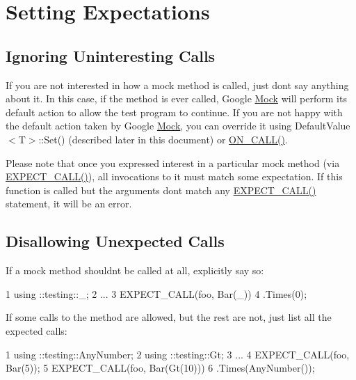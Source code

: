\section*{Setting Expectations}

\subsection*{Ignoring Uninteresting Calls}

If you are not interested in how a mock method is called, just don\textquotesingle{}t say anything about it. In this case, if the method is ever called, Google \hyperlink{class_mock}{Mock} will perform its default action to allow the test program to continue. If you are not happy with the default action taken by Google \hyperlink{class_mock}{Mock}, you can override it using {\ttfamily Default\+Value$<$T$>$\+::\+Set()} (described later in this document) or {\ttfamily \hyperlink{gmock-spec-builders_8h_a5b12ae6cf84f0a544ca811b380c37334}{O\+N\+\_\+\+C\+A\+L\+L()}}.

Please note that once you expressed interest in a particular mock method (via {\ttfamily \hyperlink{gmock-spec-builders_8h_a535a6156de72c1a2e25a127e38ee5232}{E\+X\+P\+E\+C\+T\+\_\+\+C\+A\+L\+L()}}), all invocations to it must match some expectation. If this function is called but the arguments don\textquotesingle{}t match any {\ttfamily \hyperlink{gmock-spec-builders_8h_a535a6156de72c1a2e25a127e38ee5232}{E\+X\+P\+E\+C\+T\+\_\+\+C\+A\+L\+L()}} statement, it will be an error.

\subsection*{Disallowing Unexpected Calls}

If a mock method shouldn\textquotesingle{}t be called at all, explicitly say so\+:


\begin{DoxyCode}
1 using ::testing::\_;
2 ...
3   EXPECT\_CALL(foo, Bar(\_))
4       .Times(0);
\end{DoxyCode}


If some calls to the method are allowed, but the rest are not, just list all the expected calls\+:


\begin{DoxyCode}
1 using ::testing::AnyNumber;
2 using ::testing::Gt;
3 ...
4   EXPECT\_CALL(foo, Bar(5));
5   EXPECT\_CALL(foo, Bar(Gt(10)))
6       .Times(AnyNumber());
\end{DoxyCode}


